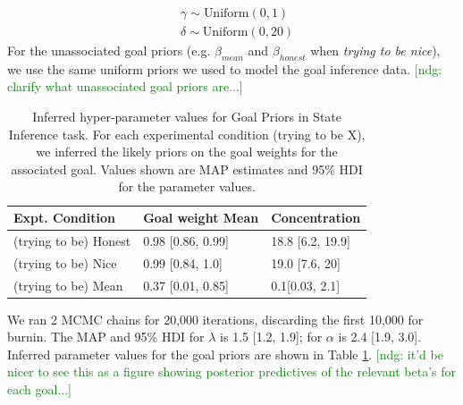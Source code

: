 \documentclass[10pt,letterpaper]{article}
\newcommand{\red}[1]{\textcolor{Red}{#1}}
\newcommand{\ndg}[1]{\textcolor{Green}{[ndg: #1]}}
\begin{document}
%
\begin{eqnarray*}
& \gamma \sim  \text{Uniform}(0,1)\\
& \delta  \sim  \text{Uniform}(0, 20)
\end{eqnarray*}
For the unassociated goal priors (e.g. $\beta_{mean}$ and $\beta_{honest}$ when \emph{trying to be nice}), we use the same uniform priors we used to model the goal inference data.
\ndg{clarify what unassociated goal priors are...}

\begin{table}[]
\centering
\begin{tabular}{lll}
\hline
Expt. Condition  & Goal weight Mean & Concentration \\ \hline
(trying to be) Honest                        &   0.98 [0.86, 0.99]   & 18.8 [6.2, 19.9] \\
(trying to be) Nice                          & 0.99 [0.84, 1.0] & 19.0 [7.6, 20] \\
(trying to be) Mean                          &0.37 [0.01, 0.85] & 0.1[0.03, 2.1] \\ \hline
\end{tabular}
\caption{\label{tab:params} Inferred hyper-parameter values for Goal Priors in State Inference task.
For each experimental condition (trying to be X), we inferred the likely priors on the goal weights for the associated goal.
Values shown are MAP estimates and 95\% HDI for the parameter values.}
\end{table}
We ran 2 MCMC chains for 20,000 iterations, discarding the first 10,000 for burnin.
The MAP and 95\% HDI for $\lambda$ is 1.5 [1.2, 1.9]; for $\alpha$ is 2.4 [1.9, 3.0]. %
Inferred parameter values for the goal priors are shown in Table \ref{tab:params}.
\ndg{it'd be nicer to see this as a figure showing posterior predictives of the relevant beta's for each goal...}
\end{document}
